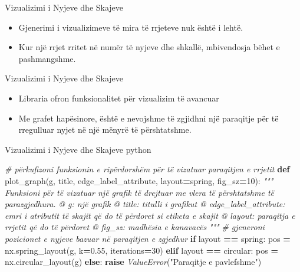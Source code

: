 \documentclass[
  ignorenonframetext,
]{beamer}
\newenvironment{Shaded}{\begin{snugshade}}{\end{snugshade}}
\newcommand{\CommentTok}[1]{\textcolor[rgb]{0.56,0.35,0.01}{\textit{#1}}}
\newcommand{\ControlFlowTok}[1]{\textcolor[rgb]{0.13,0.29,0.53}{\textbf{#1}}}
\newcommand{\DecValTok}[1]{\textcolor[rgb]{0.00,0.00,0.81}{#1}}
\newcommand{\FloatTok}[1]{\textcolor[rgb]{0.00,0.00,0.81}{#1}}
\newcommand{\KeywordTok}[1]{\textcolor[rgb]{0.13,0.29,0.53}{\textbf{#1}}}
\newcommand{\NormalTok}[1]{#1}
\newcommand{\OperatorTok}[1]{\textcolor[rgb]{0.81,0.36,0.00}{\textbf{#1}}}
\newcommand{\PreprocessorTok}[1]{\textcolor[rgb]{0.56,0.35,0.01}{\textit{#1}}}
\newcommand{\StringTok}[1]{\textcolor[rgb]{0.31,0.60,0.02}{#1}}
\begin{document}
\begin{frame}{Vizualizimi i Nyjeve dhe Skajeve}
\protect\hypertarget{vizualizimi-i-nyjeve-dhe-skajeve}{}
\begin{itemize}
\item
  Gjenerimi i vizualizimeve të mira të rrjeteve nuk është i lehtë.
\item
  Kur një rrjet rritet në numër të nyjeve dhe shkallë, mbivendosja bëhet
  e pashmangshme.
\end{itemize}
\end{frame}

\begin{frame}{Vizualizimi i Nyjeve dhe Skajeve}
\protect\hypertarget{vizualizimi-i-nyjeve-dhe-skajeve-1}{}
\begin{itemize}
\item
  Libraria ofron funksionalitet për vizualizim të avancuar
\item
  Me grafet hapësinore, është e nevojshme të zgjidhni një paraqitje për
  të rregulluar nyjet në një mënyrë të përshtatshme.
\end{itemize}
\end{frame}

\begin{frame}[fragile]{Vizualizimi i Nyjeve dhe Skajeve}
\protect\hypertarget{vizualizimi-i-nyjeve-dhe-skajeve-2}{}
python

\begin{Shaded}
\begin{Highlighting}[]
\CommentTok{\# përkufizoni funksionin e ripërdorshëm për të vizatuar paraqitjen e rrjetit}
\KeywordTok{def}\NormalTok{ plot\_graph(g, title, edge\_label\_attribute, layout}\OperatorTok{=}\StringTok{\textquotesingle{}spring\textquotesingle{}}\NormalTok{, fig\_sz}\OperatorTok{=}\DecValTok{10}\NormalTok{):}
    \CommentTok{"""}
\CommentTok{    Funksioni për të vizatuar një grafik të drejtuar me vlera të përshtatshme të parazgjedhura.}
\CommentTok{    @ g: një grafik}
\CommentTok{    @ title: titulli i grafikut}
\CommentTok{    @ edge\_label\_attribute: emri i atributit të skajit që do të përdoret si etiketa e skajit}
\CommentTok{    @ layout: paraqitja e rrjetit që do të përdoret}
\CommentTok{    @ fig\_sz: madhësia e kanavacës}
\CommentTok{    """}
    \CommentTok{\# gjeneroni pozicionet e nyjeve bazuar në paraqitjen e zgjedhur}
    \ControlFlowTok{if}\NormalTok{ layout }\OperatorTok{==} \StringTok{\textquotesingle{}spring\textquotesingle{}}\NormalTok{:}
\NormalTok{        pos }\OperatorTok{=}\NormalTok{ nx.spring\_layout(g, k}\OperatorTok{=}\FloatTok{0.55}\NormalTok{, iterations}\OperatorTok{=}\DecValTok{30}\NormalTok{)}
    \ControlFlowTok{elif}\NormalTok{ layout }\OperatorTok{==} \StringTok{\textquotesingle{}circular\textquotesingle{}}\NormalTok{:}
\NormalTok{        pos }\OperatorTok{=}\NormalTok{ nx.circular\_layout(g)}
    \ControlFlowTok{else}\NormalTok{:}
        \ControlFlowTok{raise} \PreprocessorTok{ValueError}\NormalTok{(}\StringTok{"Paraqitje e pavlefshme"}\NormalTok{)}
\end{Highlighting}
\end{Shaded}
\end{frame}
\end{document}
